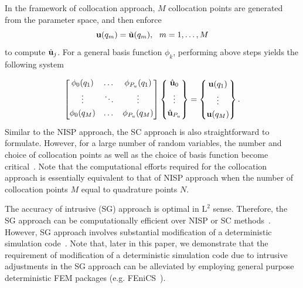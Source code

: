 \documentclass[letter,1p,11pt,oneside,onecolumn,sort&compress]{elsarticle}
\begin{document}
In the framework of collocation approach, $M$ collocation points are generated from the parameter space, and then enforce
\begin{equation}
  \mathrm{\bf{u}}(q_m) = \mathrm{\tilde{\bf{u}}}(q_m), \ \ m=1,\dots,M
\end{equation}
to compute $\mathrm{\hat{\bf{u}}}_j$. For a general basis function $\phi_k$, performing above steps yields the following system~\cite{smith2013uncertainty}

\begin{align}
{\begin{bmatrix}
      \phi_{0}(q_1) & \dots  &  \phi_{P_u}(q_1)
\\[0.3em]
      \vdots  & \ddots &  \vdots
\\[0.3em]
      \phi_{0}(q_M) & \dots  &  \phi_{P_u}(q_M)
\\[0.3em]
\end{bmatrix}}
\begin{Bmatrix}
    \mathrm{\hat{\bf{u}}}_0
\\[0.3em]
   \vdots
\\[0.3em]
    \mathrm{\hat{\bf{u}}}_{P_u}
 \\[0.3em]
\end{Bmatrix}  =
\begin{Bmatrix}
      \mathrm{\bf{u}}(q_1)
\\[0.3em]
      \vdots
 \\[0.3em]
      \mathrm{\bf{u}}(q_M)
\end{Bmatrix}.
\label{eq:coll_frame}
\end{align}
Similar to the NISP approach, the SC approach is also straightforward to formulate. However, for a large number of random variables, the number and choice of collocation points as well as the choice of basis function become critical~\cite{smith2013uncertainty}.
Note that the computational efforts required for the collocation approach is essentially equivalent to that of NISP approach when the number of collocation points $M$ equal to quadrature points $N$.

The accuracy of intrusive (SG) approach is optimal in $\mathrm{L}^2$ sense. Therefore, the SG approach can be computationally efficient over NISP or SC methods~\cite{smith2013uncertainty}. However, SG approach involves substantial modification of a deterministic simulation code~\cite{smith2013uncertainty}.
Note that, later in this paper, we demonstrate that the requirement of
modification of a deterministic simulation code due to intrusive adjustments in the SG approach can be alleviated by employing general purpose deterministic FEM packages (e.g. FEniCS~\cite{fenics/dolfin17}).
\end{document}
